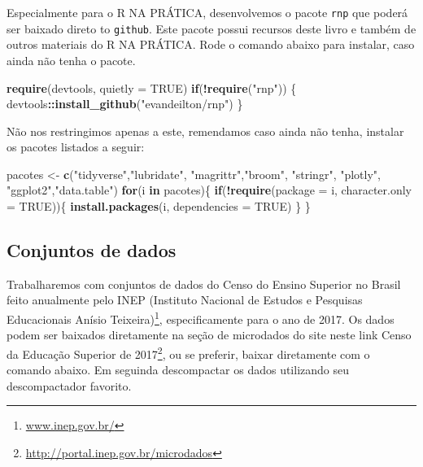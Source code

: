 \documentclass[12pt,]{style/krantz}
\makeatletter
\newenvironment{Shaded}{\begin{snugshade}}{\end{snugshade}}
\newcommand{\ControlFlowTok}[1]{\textcolor[rgb]{0.13,0.29,0.53}{\textbf{#1}}}
\newcommand{\DataTypeTok}[1]{\textcolor[rgb]{0.13,0.29,0.53}{#1}}
\newcommand{\KeywordTok}[1]{\textcolor[rgb]{0.13,0.29,0.53}{\textbf{#1}}}
\newcommand{\NormalTok}[1]{#1}
\newcommand{\OperatorTok}[1]{\textcolor[rgb]{0.81,0.36,0.00}{\textbf{#1}}}
\newcommand{\OtherTok}[1]{\textcolor[rgb]{0.56,0.35,0.01}{#1}}
\newcommand{\StringTok}[1]{\textcolor[rgb]{0.31,0.60,0.02}{#1}}
\renewcommand{\href}[2]{#2\footnote{\url{#1}}}
\newenvironment{kframe}{%
\medskip{}
\setlength{\fboxsep}{.8em}
 \def\at@end@of@kframe{}%
 \ifinner\ifhmode%
  \def\at@end@of@kframe{\end{minipage}}%
  \begin{minipage}{\columnwidth}%
 \fi\fi%
 \def\FrameCommand##1{\hskip\@totalleftmargin \hskip-\fboxsep
 \colorbox{shadecolor}{##1}\hskip-\fboxsep
     \hskip-\linewidth \hskip-\@totalleftmargin \hskip\columnwidth}%
 \MakeFramed {\advance\hsize-\width
   \@totalleftmargin\z@ \linewidth\hsize
   \@setminipage}}%
 {\par\unskip\endMakeFramed%
 \at@end@of@kframe}
\renewenvironment{Shaded}{\begin{kframe}}{\end{kframe}}
\theoremstyle{definition}
\theoremstyle{definition}
\theoremstyle{definition}
\theoremstyle{remark}
\makeatother
\begin{document}
Especialmente para o R NA PRÁTICA, desenvolvemos o pacote \texttt{rnp} que poderá ser baixado direto to \texttt{github}. Este pacote possui recursos deste livro e também de outros materiais do R NA PRÁTICA.
Rode o comando abaixo para instalar, caso ainda não tenha o pacote.

\begin{Shaded}
\begin{Highlighting}[]
\KeywordTok{require}\NormalTok{(devtools, }\DataTypeTok{quietly =} \OtherTok{TRUE}\NormalTok{)}
\ControlFlowTok{if}\NormalTok{(}\OperatorTok{!}\KeywordTok{require}\NormalTok{(}\StringTok{"rnp"}\NormalTok{)) \{}
\NormalTok{ devtools}\OperatorTok{::}\KeywordTok{install_github}\NormalTok{(}\StringTok{"evandeilton/rnp"}\NormalTok{) }
\NormalTok{\}}
\end{Highlighting}
\end{Shaded}

Não nos restringimos apenas a este, remendamos caso ainda não tenha, instalar os pacotes listados a seguir:

\begin{Shaded}
\begin{Highlighting}[]
\NormalTok{pacotes <-}\StringTok{ }\KeywordTok{c}\NormalTok{(}\StringTok{"tidyverse"}\NormalTok{,}\StringTok{"lubridate"}\NormalTok{, }\StringTok{"magrittr"}\NormalTok{,}\StringTok{"broom"}\NormalTok{,}
             \StringTok{"stringr"}\NormalTok{, }\StringTok{"plotly"}\NormalTok{, }\StringTok{"ggplot2"}\NormalTok{,}\StringTok{"data.table"}\NormalTok{)}
\ControlFlowTok{for}\NormalTok{(i }\ControlFlowTok{in}\NormalTok{ pacotes)\{}
  \ControlFlowTok{if}\NormalTok{(}\OperatorTok{!}\KeywordTok{require}\NormalTok{(}\DataTypeTok{package =}\NormalTok{ i, }\DataTypeTok{character.only =} \OtherTok{TRUE}\NormalTok{))\{}
    \KeywordTok{install.packages}\NormalTok{(i, }\DataTypeTok{dependencies =} \OtherTok{TRUE}\NormalTok{)}
\NormalTok{  \}}
\NormalTok{\}}
\end{Highlighting}
\end{Shaded}

\hypertarget{conjuntos-de-dados}{%
\subsection*{Conjuntos de dados}\label{conjuntos-de-dados}}


Trabalharemos com conjuntos de dados do Censo do Ensino Superior no Brasil feito anualmente pelo \href{www.inep.gov.br/}{INEP (Instituto Nacional de Estudos e Pesquisas Educacionais Anísio Teixeira)}, especificamente para o ano de 2017. Os dados podem ser baixados diretamente na seção de microdados do site neste link \href{http://portal.inep.gov.br/microdados}{Censo da Educação Superior de 2017}, ou se preferir, baixar diretamente com o comando abaixo. Em seguinda descompactar os dados utilizando seu descompactador favorito.
\end{document}
